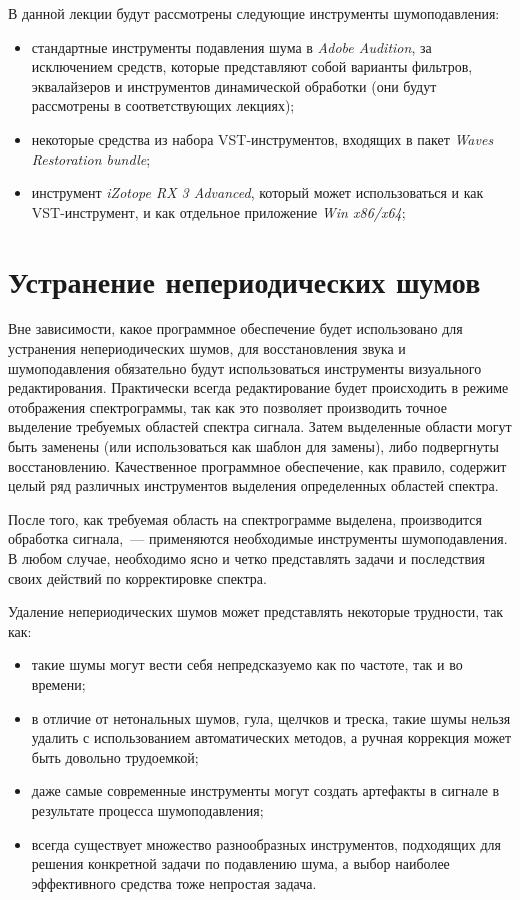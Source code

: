 \documentclass[oneside, final, 14pt]{extreport}
\begin{document}
В данной лекции будут рассмотрены следующие инструменты шумоподавления:
\begin{itemize}
  \item стандартные инструменты подавления шума в \emph{Adobe Audition}, за исключением средств, которые представляют собой варианты фильтров, эквалайзеров и инструментов динамической обработки (они будут рассмотрены в соответствующих лекциях);
  \item некоторые средства из набора VST-инструментов, входящих в пакет \emph{Waves Restoration bundle};
  \item инструмент \emph{iZotope RX 3 Advanced}, который может использоваться и как VST-инструмент, и как отдельное приложение \emph{Win x86/x64};
\end{itemize}

\section{Устранение непериодических шумов}

Вне зависимости, какое программное обеспечение будет использовано для устранения непериодических шумов, для восстановления звука и шумоподавления обязательно будут использоваться инструменты визуального редактирования. Практически всегда редактирование будет происходить в режиме отображения спектрограммы, так как это позволяет производить точное выделение требуемых областей спектра сигнала. Затем выделенные области могут быть заменены (или использоваться как шаблон для замены), либо подвергнуты восстановлению. Качественное программное обеспечение, как правило, содержит целый ряд различных инструментов выделения определенных областей спектра.

После того, как требуемая область на спектрограмме выделена, производится обработка сигнала,~--- применяются необходимые инструменты шумоподавления. В любом случае, необходимо ясно и четко представлять задачи и последствия своих действий по корректировке спектра.

Удаление непериодических шумов может представлять некоторые трудности, так как:
\begin{itemize}
  \item такие шумы могут вести себя непредсказуемо как по частоте, так и во времени;
  \item в отличие от нетональных шумов, гула, щелчков и треска, такие шумы нельзя удалить с использованием автоматических методов, а ручная коррекция может быть довольно трудоемкой;
  \item даже самые современные инструменты могут создать артефакты в сигнале в результате процесса шумоподавления;
  \item всегда существует множество разнообразных инструментов, подходящих для решения конкретной задачи по подавлению шума, а выбор наиболее эффективного средства тоже непростая задача.
\end{itemize}
\end{document}
